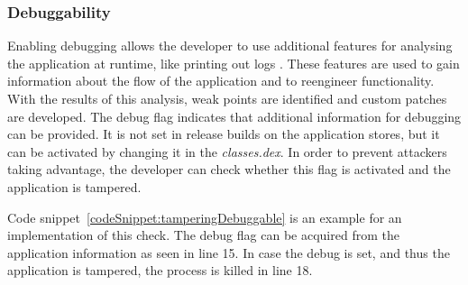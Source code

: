 \subsubsection{Debuggability} \label{subsection:section:counter-improve-tampering-debuggable}
Enabling debugging allows the developer to use additional features for analysing the application at runtime, like printing out logs \cite{androidDebugging}.
These features are used to gain information about the flow of the application and to reengineer functionality.
With the results of this analysis, weak points are identified and custom patches are developed.
\newline
The debug flag indicates that additional information for debugging can be provided.
It is not set in release builds on the application stores, but it can be activated by changing it in the \textit{classes.dex}.
In order to prevent attackers taking advantage, the developer can check whether this flag is activated and the application is tampered.

Code snippet~\ref{codeSnippet:tamperingDebuggable} is an example for an implementation of this check.
The debug flag can be acquired from the application information as seen in line 15.
In case the debug is set, and thus the application is tampered, the process is killed in line 18.
